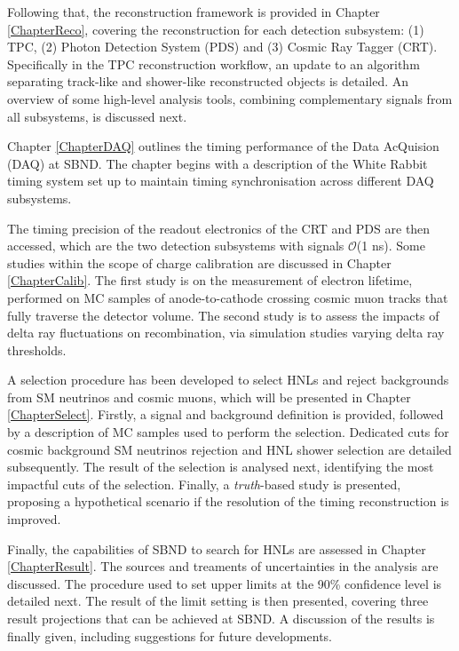 Following that, the reconstruction framework is provided in Chapter \ref{ChapterReco}, covering the reconstruction for each detection subsystem: (1) TPC, (2) Photon Detection System (PDS) and (3) Cosmic Ray Tagger (CRT).
Specifically in the TPC reconstruction workflow, an update to an algorithm separating track-like and shower-like reconstructed objects is detailed.
An overview of some high-level analysis tools, combining complementary signals from all subsystems, is discussed next. 
                                                                                                                       
Chapter \ref{ChapterDAQ} outlines the timing performance of the Data AcQuision (DAQ) at SBND.
The chapter begins with a description of the White Rabbit timing system set up to maintain timing synchronisation across different DAQ subsystems.

The timing precision of the readout electronics of the CRT and PDS are then accessed, which are the two detection subsystems with signals $\mathcal{O}$(1 ns).
Some studies within the scope of charge calibration are discussed in Chapter \ref{ChapterCalib}.
The first study is on the measurement of electron lifetime, performed on MC samples of anode-to-cathode crossing cosmic muon tracks that fully traverse the detector volume.
The second study is to assess the impacts of delta ray fluctuations on recombination, via simulation studies varying delta ray thresholds.  
                                                                                                                                            
A selection procedure has been developed to select HNLs and reject backgrounds from SM neutrinos and cosmic muons, which will be presented in Chapter \ref{ChapterSelect}.
Firstly, a signal and background definition is provided, followed by a description of MC samples used to perform the selection.
Dedicated cuts for cosmic background SM neutrinos rejection and HNL shower selection are detailed subsequently.
The result of the selection is analysed next, identifying the most impactful cuts of the selection.
Finally, a \textit{truth}-based study is presented, proposing a hypothetical scenario if the resolution of the timing reconstruction is improved.
                                                                                                                                                     
Finally, the capabilities of SBND to search for HNLs are assessed in Chapter \ref{ChapterResult}.
The sources and treaments of uncertainties in the analysis are discussed.
The procedure used to set upper limits at the 90\% confidence level is detailed next. 
The result of the limit setting is then presented, covering three result projections that can be achieved at SBND.
A discussion of the results is finally given, including suggestions for future developments.                        

